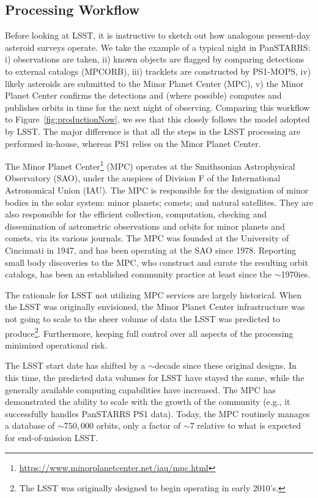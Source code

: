 \documentclass[DM,authoryear,toc,lsstdraft]{lsstdoc}
\begin{document}
\subsection{Processing Workflow\label{sec:promptSSP}}

Before looking at LSST, it is instructive to sketch out how analogous present-day asteroid surveys operate. We take the example of a typical night in PanSTARRS: i) observations are taken, ii) known objects are flagged by comparing detections to external catalogs (MPCORB), iii) tracklets are constructed by PS1-MOPS, iv) likely asteroids are submitted to the Minor Planet Center (MPC), v) the Minor Planet Center confirms the detections and (where possible) computes and publishes orbits in time for the next night of observing. 
Comparing this workflow to Figure~\ref{fig:productionNow}, we see that this closely follows the model adopted by LSST. The major difference is that all the steps in the LSST processing are performed in-house, whereas PS1 relies on the Minor Planet Center.

The Minor Planet Center\footnote{\url{https://www.minorplanetcenter.net/iau/mpc.html}} (MPC) operates at the Smithsonian Astrophysical Observatory (SAO), under the auspices of Division F of the International Astronomical Union (IAU). The MPC is responsible for the designation of minor bodies in the solar system: minor planets; comets; and natural satellites. They are also responsible for the efficient collection, computation, checking and dissemination of astrometric observations and orbits for minor planets and comets, via its various journals. The MPC was founded at the University of Cincinnati in 1947, and has been operating at the SAO since 1978. Reporting small body discoveries to the MPC, who construct and curate the resulting orbit catalogs, has been an established community practice at least since the $\sim$1970ies.

The rationale for LSST not utilizing MPC services are largely historical. When the LSST was originally envisioned, the Minor Planet Center infrastructure was not going to scale to the sheer volume of data the LSST was predicted to produce\footnote{The LSST was originally designed to begin operating in early 2010's.}. Furthermore, keeping full control over all aspects of the processing minimized operational risk.

The LSST start date has shifted by a $\sim$decade since these original designs. In this time, the predicted data volumes for LSST have stayed the same, while the generally available computing capabilities have increased. The MPC has demonstrated the ability to scale with the growth of the community (e.g., it successfully handles PanSTARRS PS1 data). Today, the MPC routinely manages a database of $\sim 750,000$ orbits, only a factor of $\sim 7$ relative to what is expected for end-of-mission LSST.
\end{document}
